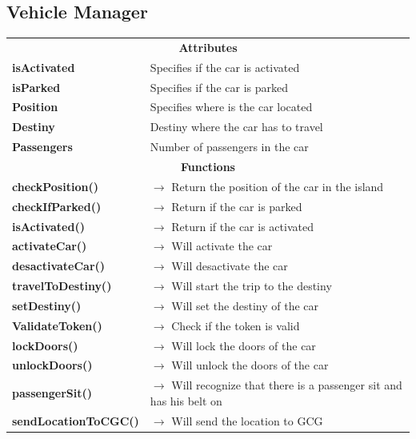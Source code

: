 \documentclass[12pt]{article}
\begin{document}
\subsection{Vehicle Manager}
\begin{table}[H]
\begin{tabularx}{\hsize}{|X|X|}
    \hline
    \rowcolor{vehiclered}
    \multicolumn{2}{|c|}{\textbf{\texttt{Vehicle}}} \\
    \hline
    \hline
    \multicolumn{2}{|c|}{\textbf{Attributes}}      \\
    \hline
    \textbf{isActivated} & Specifies if the car is activated \\
    \textbf{isParked} & Specifies if the car is parked \\
    \textbf{Position} & Specifies where is the car located \\
    \textbf{Destiny} & Destiny where the car has to travel\\
    \textbf{Passengers} & Number of passengers in the car\\
    \hline
    \multicolumn{2}{|c|}{\textbf{Functions}} \\
    \hline
    \textbf{checkPosition()} & $\rightarrow$ Return the position of the car in the island \\
    \textbf{checkIfParked()} & $\rightarrow$ Return if the car is parked \\
    \textbf{isActivated()} & $\rightarrow$ Return if the car is activated \\
    \textbf{activateCar()} & $\rightarrow$ Will activate the car \\
	\textbf{desactivateCar()} & $\rightarrow$ Will desactivate the car  \\
	\textbf{travelToDestiny()} & $\rightarrow$ Will start the trip to the destiny \\
    \textbf{setDestiny()} & $\rightarrow$ Will set the destiny of the car\\
	\textbf{ValidateToken()} & $\rightarrow$ Check if the token is valid \\
	\textbf{lockDoors()} & $\rightarrow$ Will lock the doors of the car \\
	\textbf{unlockDoors()} & $\rightarrow$ Will unlock the doors of the car \\
	\textbf{passengerSit()} & $\rightarrow$ Will recognize that there is a passenger sit and has his belt on \\
	\textbf{sendLocationToCGC()} & $\rightarrow$ Will send the location to GCG \\
    \hline
\end{tabularx}
\end{table}
\end{document}
